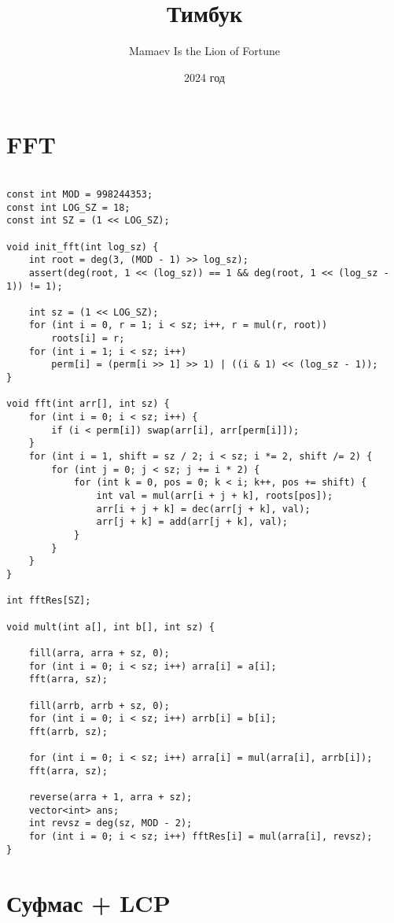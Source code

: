 \documentclass{article}
\title{Тимбук}
\author{Mamaev Is the Lion of Fortune}
\date{2024 год}
\begin{document}
    
    \maketitle
    
    \section*{FFT}

    \begin{verbatim}

const int MOD = 998244353;
const int LOG_SZ = 18;
const int SZ = (1 << LOG_SZ);

void init_fft(int log_sz) {
    int root = deg(3, (MOD - 1) >> log_sz);
    assert(deg(root, 1 << (log_sz)) == 1 && deg(root, 1 << (log_sz - 1)) != 1);
    
    int sz = (1 << LOG_SZ);
    for (int i = 0, r = 1; i < sz; i++, r = mul(r, root))
        roots[i] = r;
    for (int i = 1; i < sz; i++)
        perm[i] = (perm[i >> 1] >> 1) | ((i & 1) << (log_sz - 1));
}

void fft(int arr[], int sz) {
    for (int i = 0; i < sz; i++) {
        if (i < perm[i]) swap(arr[i], arr[perm[i]]);
    }
    for (int i = 1, shift = sz / 2; i < sz; i *= 2, shift /= 2) {
        for (int j = 0; j < sz; j += i * 2) {
            for (int k = 0, pos = 0; k < i; k++, pos += shift) {
                int val = mul(arr[i + j + k], roots[pos]);
                arr[i + j + k] = dec(arr[j + k], val);
                arr[j + k] = add(arr[j + k], val);
            }
        }
    }
}

int fftRes[SZ];

void mult(int a[], int b[], int sz) {

    fill(arra, arra + sz, 0);
    for (int i = 0; i < sz; i++) arra[i] = a[i];
    fft(arra, sz);

    fill(arrb, arrb + sz, 0);
    for (int i = 0; i < sz; i++) arrb[i] = b[i];
    fft(arrb, sz);

    for (int i = 0; i < sz; i++) arra[i] = mul(arra[i], arrb[i]);
    fft(arra, sz);

    reverse(arra + 1, arra + sz);
    vector<int> ans;
    int revsz = deg(sz, MOD - 2);
    for (int i = 0; i < sz; i++) fftRes[i] = mul(arra[i], revsz);
}
    \end{verbatim}

    \section*{Суфмас + LCP}
\end{document}
